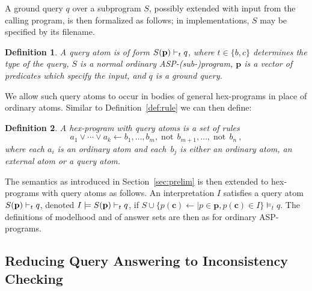 \documentclass[11pt,fleqn,twoside]{article}
\renewcommand{\vec}[1]{\ensuremath{\mb{#1}}}
\newcommand{\mb}[1]{\ensuremath{\mathbf{#1}}}
\def\naf{\ensuremath{\mathop{not}}}
\newcommand\hex{{\sc hex}\xspace}
\newtheorem{definition}{Definition}
\begin{document}
			\newcommand{\queryatom}[4]{\ifthenelse{\equal{#4}{}}{#2}{#2(#4)} \vdash_{#1} #3}
			
			A ground query $q$ over a subprogram $S$, possibly extended with input from the calling program, is then formalized as follows;
			in implementations, $S$ may be specified by its filename.
			\begin{definition}
				A \emph{query atom} is of form $\queryatom{t}{S}{q}{\vec{p}}$, where $t \in \{ b, c \}$ determines the type of the query,
				$S$ is a normal ordinary ASP-(sub-)program, $\vec{p}$ is a vector of predicates which specify the input, and $q$ is a ground query.
			\end{definition}
			

			We allow such query atoms to occur in bodies of general \hex-programs in place of ordinary atoms.
			Similar to Definition~\ref{def:rule} we can then define:

			\begin{definition}
				\label{def:programswithqueryatoms}
				A \emph{\hex-program with query atoms} is a set of rules
				\begin{equation*}
					\label{eq:rule}
				  a_1\lor\cdots\lor a_k \leftarrow b_1,\dotsc, b_m, \naf\, b_{m+1}, \dotsc, \naf\, b_n \ ,
				\end{equation*}
				where each $a_i$ is an ordinary atom and each~$b_j$
				is either an ordinary atom, an external atom or a query atom.
			\end{definition}
			
			The semantics as introduced in Section~\ref{sec:prelim} is then extended to \hex-programs with query atoms as follows.
			An interpretation $I$ satisfies a query atom $\queryatom{t}{S}{q}{\vec{p}}$, denoted $I \models \queryatom{t}{S}{q}{\vec{p}}$, if $S \cup \{ p(\vec{c}) \leftarrow \mid p \in \vec{p}, p(\vec{c}) \in I \} \models_t q$.
			The definitions of modelhood and of answer sets are then as for ordinary ASP-programs.

		\subsection{Reducing Query Answering to Inconsistency Checking}
		\label{sec:queryansweringencoding}
\end{document}
